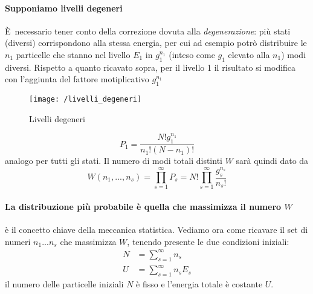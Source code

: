 \paragraph{Supponiamo livelli degeneri}
È necessario tener conto della correzione dovuta alla \textit{degenerazione}: più stati (diversi) corrispondono alla stessa energia, per cui ad esempio potrò distribuire le $n_1$ particelle che stanno nel livello $E_1$ in $g_1^{n_1}$ (inteso come $g_1$ elevato alla $n_1$) modi diversi.
Rispetto a quanto ricavato sopra, per il livello 1 il risultato si modifica con l'aggiunta del fattore motiplicativo $g_1^{n_1}$
\begin{figure}[h]
\centering
\texttt{[image: /livelli\_degeneri]}
\caption{Livelli degeneri}
\label{esempio_partizione}
\end{figure}
\begin{equation}
P_1 = \frac{ N! g_1^{n_1}}{n_1! (N-n_1)! }
\end{equation}
analogo per tutti gli stati.
Il numero di modi totali distinti $W$ sarà quindi dato da
\begin{equation}
W(n_1,...,n_s) = \prod_{s=1}^{\infty} P_s = N! \prod_{s=1}^{\infty}\frac{ g_s^{n_s}}{ n_s!}
\end{equation}

\paragraph{La distribuzione più probabile è quella che massimizza il numero $W$} è il concetto chiave della meccanica statistica.
Vediamo ora come ricavare il set di numeri $n_1 ... n_s$ che massimizza $W$, tenendo presente le due condizioni iniziali: 
\begin{equation}
\begin{split}
N & =  \sum_{s=1}^{\infty} n_s \\
U & =  \sum_{s=1}^{\infty} n_s E_s
\end{split}
\end{equation}
il numero delle particelle iniziali $N$ è fisso e l'energia totale è costante $U$.

